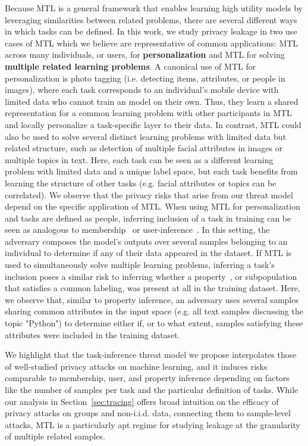 Because MTL is a general framework that enables learning high utility models by leveraging similarities between related problems, there are several different ways in which tasks can be defined. In this work, we study privacy leakage in two use cases of MTL which we believe are representative of common applications: MTL across many individuals, or users, for \textbf{personalization} and MTL for solving \textbf{multiple related learning problems}. A canonical use of MTL for personalization is photo tagging (i.e. detecting items, attributes, or people in images), where each task corresponds to an individual's mobile device with limited data who cannot train an model on their own. Thus, they learn a shared representation for a common learning problem with other participants in MTL and locally personalize a task-specific layer to their data. In contrast, MTL could also be used to solve several distinct learning problems with limited data but related structure, such as detection of multiple facial attributes in images or multiple topics in text. Here, each task can be seen as a different learning problem with limited data and a unique label space, but each task benefits from learning the structure of other tasks (e.g. facial attributes or topics can be correlated). We observe that the privacy risks that arise from our threat model depend on the specific application of MTL. When using MTL for personalization and tasks are defined as people, inferring inclusion of a task in training can be seen as analogous to membership~\cite{homer-2008-mi} or user-inference~\cite{kandpal2023userinference}. In this setting, the adversary composes the model's outputs over several samples belonging to an individual to determine if any of their data appeared in the dataset. If MTL is used to simultaneously solve multiple learning problems, inferring a task's inclusion poses a similar risk to inferring whether a property~\cite{ateniese-2015-property_inference, hartmann-2023-distributioninference, chaudhari-2022-snap}, or subpopulation that satisfies a common labeling, was present at all in the training dataset. Here, we observe that, similar to property inference, an adversary uses several samples sharing common attributes in the input space (e.g. all text samples discussing the topic "Python") to determine either if, or to what extent, samples satisfying these attributes were included in the training dataset. 

We highlight that the task-inference threat model we propose interpolates those of well-studied privacy attacks on machine learning, and it induces risks comparable to membership, user, and property inference depending on factors like the number of samples per task and the particular definition of tasks. While our analysis in Section~\ref{sec:tracing} offers broad intuition on the efficacy of privacy attacks on groups and non-i.i.d. data, connecting them to sample-level attacks, MTL is a particularly apt regime for studying leakage at the granularity of multiple related samples.

